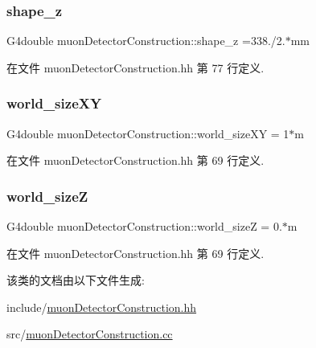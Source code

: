 \subsubsection{\texorpdfstring{shape\+\_\+z}{shape\_z}}
{\footnotesize\ttfamily G4double muon\+Detector\+Construction\+::shape\+\_\+z =338./2.$\ast$mm\hspace{0.3cm}{\ttfamily [private]}}



在文件 muon\+Detector\+Construction.\+hh 第 77 行定义.

\mbox{\label{classmuonDetectorConstruction_a658d653c8308534496baa24f7aaf938b}} 
\subsubsection{\texorpdfstring{world\+\_\+size\+XY}{world\_sizeXY}}
{\footnotesize\ttfamily G4double muon\+Detector\+Construction\+::world\+\_\+size\+XY = 1$\ast$m\hspace{0.3cm}{\ttfamily [private]}}



在文件 muon\+Detector\+Construction.\+hh 第 69 行定义.

\mbox{\label{classmuonDetectorConstruction_a0260171e245912eeff14a2bdb7cca44c}} 
\subsubsection{\texorpdfstring{world\+\_\+sizeZ}{world\_sizeZ}}
{\footnotesize\ttfamily G4double muon\+Detector\+Construction\+::world\+\_\+sizeZ = 0.$\ast$m\hspace{0.3cm}{\ttfamily [private]}}



在文件 muon\+Detector\+Construction.\+hh 第 69 行定义.



该类的文档由以下文件生成\+:\begin{DoxyCompactItemize}
\item 
include/\hyperlink{muonDetectorConstruction_8hh}{muon\+Detector\+Construction.\+hh}\item 
src/\hyperlink{muonDetectorConstruction_8cc}{muon\+Detector\+Construction.\+cc}\end{DoxyCompactItemize}
